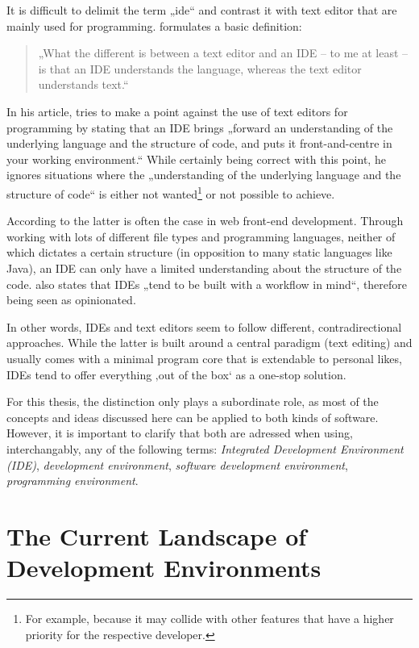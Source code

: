 It is difficult to delimit the term „\acl{ide}“ and contrast it with
text editor that are mainly used for programming. 
formulates a basic definition:

\begin{quote}
„What the different is between a text editor and an IDE – to me at least
– is that an IDE understands the language, whereas the text editor
understands text.“ \citeyear{reynolds}
\end{quote}

In his article,  tries to make a point against the
use of text editors for programming by stating that an IDE brings
„forward an understanding of the underlying language and the structure
of code, and puts it front-and-centre in your working environment.“
\citeyear{reynolds} While certainly being correct with this point, he
ignores situations where the „understanding of the underlying language
and the structure of code“ is either not
wanted\footnote{For example, because it may collide with other features that have a higher priority for the respective developer.}
or not possible to achieve.

According to  the latter is often the case in web
front-end development. Through working with lots of different file types
and programming languages, neither of which dictates a certain structure
(in opposition to many static languages like Java), an IDE can only have
a limited understanding about the structure of the code.
 also states that IDEs „tend to be built with a workflow
in mind“, therefore being seen as opinionated.

In other words, IDEs and text editors seem to follow different,
contradirectional approaches. While the latter is built around a central
paradigm (text editing) and usually comes with a minimal program core
that is extendable to personal likes, IDEs tend to offer everything ‚out
of the box‘ as a one-stop solution.

For this thesis, the distinction only plays a subordinate role, as most
of the concepts and ideas discussed here can be applied to both kinds of
software. However, it is important to clarify that both are adressed
when using, interchangably, any of the following terms: \emph{Integrated
Development Environment (IDE)}, \emph{development environment},
\emph{software development environment}, \emph{programming environment}.

\section{The Current Landscape of Development
Environments}\label{the-current-landscape-of-development-environments}

